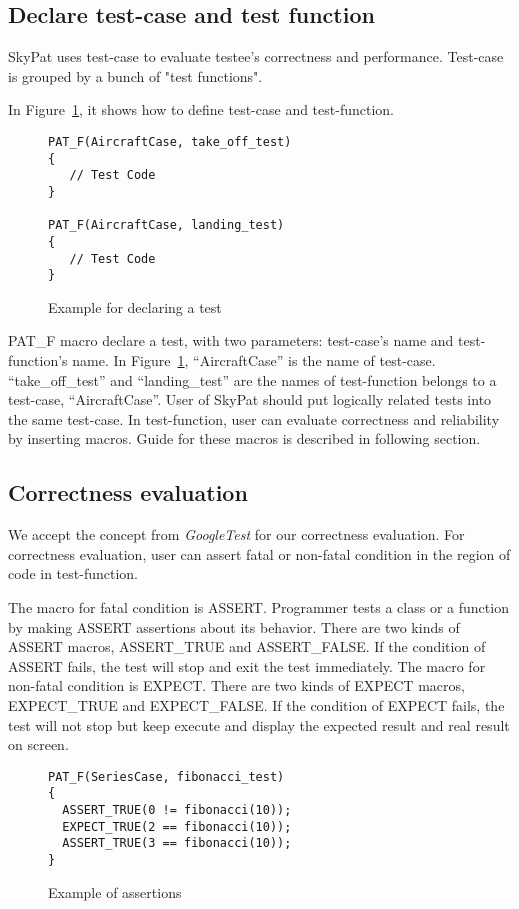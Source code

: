 \documentclass[final]{ols}
\begin{document}
\subsection{Declare test-case and test function}

SkyPat uses test-case to evaluate testee's correctness and performance.
Test-case is grouped by a bunch of "test functions".

In Figure~\ref{aircraftcase}, it shows how to define test-case and test-function.

\begin{figure}[h]
\lstset{language=C++}
\begin{lstlisting}[frame=single]
PAT_F(AircraftCase, take_off_test)
{
   // Test Code
}

PAT_F(AircraftCase, landing_test)
{
   // Test Code
}
\end{lstlisting}
\caption{Example for declaring a test}
\label{aircraftcase}
\end{figure}

PAT\_F macro declare a test, with two parameters: test-case's name and test-function's name.
In Figure~\ref{aircraftcase}, ``AircraftCase'' is the name of test-case.
``take\_off\_test'' and ``landing\_test'' are the names of test-function belongs to a test-case, ``AircraftCase''.
User of SkyPat should put logically related tests into the same test-case.
In test-function, user can evaluate correctness and reliability by inserting macros.
Guide for these macros is described in following section.

\subsection{Correctness evaluation}
We accept the concept from \textit{GoogleTest} for our correctness evaluation.
For correctness evaluation, user can assert fatal or non-fatal condition in the region of code in test-function.

The macro for fatal condition is ASSERT.
Programmer tests a class or a function by making ASSERT assertions about its behavior.
There are two kinds of ASSERT macros, ASSERT\_TRUE and ASSERT\_FALSE.
If the condition of ASSERT fails, the test will stop and exit the test immediately.
The macro for non-fatal condition is EXPECT.
There are two kinds of EXPECT macros, EXPECT\_TRUE and EXPECT\_FALSE.
If the condition of EXPECT fails, the test will not stop but keep execute and display the expected result and real result on screen.

\begin{figure}[h]
\lstset{language=C++}
\begin{lstlisting}[frame=single]
PAT_F(SeriesCase, fibonacci_test)
{
  ASSERT_TRUE(0 != fibonacci(10));
  EXPECT_TRUE(2 == fibonacci(10));
  ASSERT_TRUE(3 == fibonacci(10));
}
\end{lstlisting}
\caption{Example of assertions}
\label{assert_example}
\end{figure}
\end{document}
